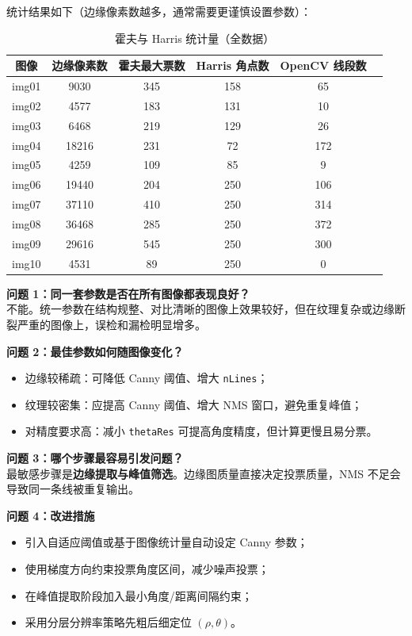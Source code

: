 \documentclass[12pt,a4paper]{ctexart}
\begin{document}
统计结果如下（边缘像素数越多，通常需要更谨慎设置参数）：
\begin{table}[H]
    \centering
    \caption{霍夫与 Harris 统计量（全数据）}
    \begin{tabular}{cccccc}
        \toprule
        图像 & 边缘像素数 & 霍夫最大票数 & Harris 角点数 & OpenCV 线段数 \\
        \midrule
        img01 & 9030  & 345 & 158 & 65  \\
        img02 & 4577  & 183 & 131 & 10  \\
        img03 & 6468  & 219 & 129 & 26  \\
        img04 & 18216 & 231 & 72  & 172 \\
        img05 & 4259  & 109 & 85  & 9   \\
        img06 & 19440 & 204 & 250 & 106 \\
        img07 & 37110 & 410 & 250 & 314 \\
        img08 & 36468 & 285 & 250 & 372 \\
        img09 & 29616 & 545 & 250 & 300 \\
        img10 & 4531  & 89  & 250 & 0   \\
        \bottomrule
    \end{tabular}
\end{table}

\textbf{问题 1：同一套参数是否在所有图像都表现良好？}\\
不能。统一参数在结构规整、对比清晰的图像上效果较好，但在纹理复杂或边缘断裂严重的图像上，误检和漏检明显增多。

\textbf{问题 2：最佳参数如何随图像变化？}\\
\begin{itemize}
    \item 边缘较稀疏：可降低 Canny 阈值、增大 \texttt{nLines}；
    \item 纹理较密集：应提高 Canny 阈值、增大 NMS 窗口，避免重复峰值；
    \item 对精度要求高：减小 \texttt{thetaRes} 可提高角度精度，但计算更慢且易分票。
\end{itemize}

\textbf{问题 3：哪个步骤最容易引发问题？}\\
最敏感步骤是\textbf{边缘提取与峰值筛选}。边缘图质量直接决定投票质量，NMS 不足会导致同一条线被重复输出。

\textbf{问题 4：改进措施}\\
\begin{itemize}
    \item 引入自适应阈值或基于图像统计量自动设定 Canny 参数；
    \item 使用梯度方向约束投票角度区间，减少噪声投票；
    \item 在峰值提取阶段加入最小角度/距离间隔约束；
    \item 采用分层分辨率策略先粗后细定位 $(\rho,\theta)$。
\end{itemize}
\end{document}
